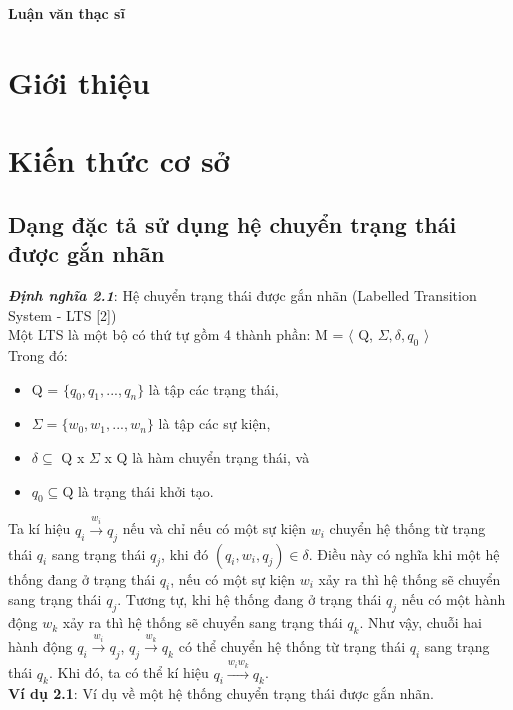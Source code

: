 \documentclass[a4paper,13pt,oneside,openany]{book}
\begin{document}
	\begin{center}
		\textbf{\large Luận văn thạc sĩ}
	\end{center}
	\begin{flushleft}
	\chapter{Giới thiệu}
	\chapter{Kiến thức cơ sở}
		\section{Dạng đặc tả sử dụng hệ chuyển trạng thái được gắn nhãn}
		\justify
		\textbf{\textit{Định nghĩa 2.1}}: Hệ chuyển trạng thái được gắn nhãn (Labelled Transition System - LTS [2])\\
		Một LTS là một bộ có thứ tự gồm 4 thành phần: M = $\langle$ Q, $\Sigma, \delta, q_{0}$ $\rangle$\\
		Trong đó:
		\begin{itemize}
			\item Q = $\{q_{0}, q_{1}, ..., q_{n}\}$ là tập các trạng thái,
			\item $\Sigma = \{w_{0}, w_{1}, ..., w_n\}$ là tập các sự kiện,
			\item $\delta \subseteq$ Q x $\Sigma$ x Q là hàm chuyển trạng thái, và
			\item $q_{0} \subseteq \textrm{Q}$ là trạng thái khởi tạo.
		\end{itemize}
		Ta kí hiệu $q_i \overset{w_i}{\longrightarrow} q_{j}$ nếu và chỉ nếu có một sự kiện $w_i$ chuyển hệ thống từ trạng thái $q_i$ sang trạng thái $q_j$, khi đó $(q_i, w_i, q_j) \in \delta$. Điều này có nghĩa khi một hệ thống đang ở trạng thái $q_i$, nếu có một sự kiện $w_i$ xảy ra thì hệ thống sẽ chuyển sang trạng thái $q_j$. Tương tự, khi hệ thống đang ở trạng thái $q_j$ nếu có một hành động $w_k$ xảy ra thì hệ thống sẽ chuyển sang trạng thái $q_k$. Như vậy, chuỗi hai hành động  $q_i \overset{w_i}{\longrightarrow} q_j$,  $q_j \overset{w_k}{\longrightarrow} q_k$ có thể chuyển hệ thống từ trạng thái $q_i$ sang trạng thái $q_k$. Khi đó, ta có thể kí hiệu  $q_i \overset{w_iw_k}{\longrightarrow} q_{k}$.\\
		\textbf{Ví dụ 2.1}: Ví dụ về một hệ thống chuyển trạng thái được gắn nhãn.\\
		\begin{figure}[h]
			\centering

\end{figure}
\end{flushleft}
\end{document}
